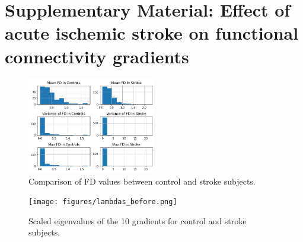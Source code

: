 \documentclass[fleqn,10pt]{wlscirep}
\begin{document}

\printbibliography


\appendix
\section*{Supplementary Material: Effect of acute ischemic stroke on functional connectivity gradients}

\setcounter{figure}{0}
\renewcommand{\figurename}{Supplementary Figure}

\begin{figure}[h!]
\centering
\includegraphics[width=0.5\textwidth]{figures/FD.png}
\caption{\label{fig:FD} Comparison of FD values between control and stroke subjects.  } 
\end{figure}

\begin{figure}[h!]
\centering
\texttt{[image: figures/lambdas\_before.png]}
\renewcommand{\figurename}{Supplementary Figure}
\caption{\label{fig:lambdas} Scaled eigenvalues of the 10 gradients for control and stroke subjects.  } 
\end{figure}
\end{document}
